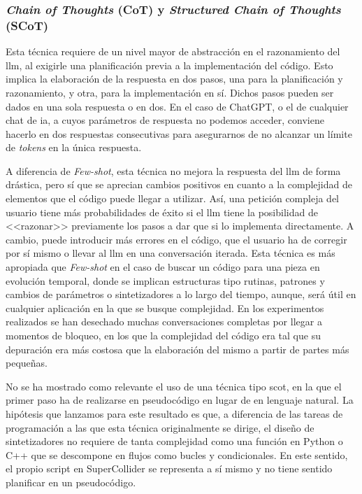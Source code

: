 \subsubsection{\textit{Chain of Thoughts} (CoT) y \textit{Structured Chain of Thoughts} (SCoT)}

Esta técnica requiere de un nivel mayor de abstracción en el razonamiento del \gls{llm}, al exigirle una planificación previa a la implementación del código. Esto implica la elaboración de la respuesta en dos pasos, una para la planificación y razonamiento, y otra, para la implementación en sí. Dichos pasos pueden ser dados en una sola respuesta o en dos. En el caso de ChatGPT, o el de cualquier chat de \gls{ia}, a cuyos parámetros de respuesta no podemos acceder, conviene hacerlo en dos respuestas consecutivas para asegurarnos de no alcanzar un límite de \textit{tokens} en la única respuesta. 

A diferencia de \textit{Few-shot}, esta técnica no mejora la respuesta del \gls{llm} de forma drástica, pero sí que se aprecian cambios positivos en cuanto a la complejidad de elementos que el código puede llegar a utilizar. Así, una petición compleja del usuario tiene más probabilidades de éxito si el \gls{llm} tiene la posibilidad de <<razonar>> previamente los pasos a dar que si lo implementa directamente. A cambio, puede introducir más errores en el código, que el usuario ha de corregir por sí mismo o llevar al \gls{llm} en una conversación iterada. Esta técnica es más apropiada que \textit{Few-shot} en el caso de buscar un código para una pieza en evolución temporal, donde se implican estructuras tipo rutinas, patrones y cambios de parámetros o sintetizadores a lo largo del tiempo, aunque, será útil en cualquier aplicación en la que se busque complejidad. En los experimentos realizados se han desechado muchas conversaciones completas por llegar a momentos de bloqueo, en los que la complejidad del código era tal que su depuración era más costosa que la elaboración del mismo a partir de partes más pequeñas.

No se ha mostrado como relevante el uso de una técnica tipo \gls{scot}, en la que el primer paso ha de realizarse en pseudocódigo en lugar de en lenguaje natural. La hipótesis que lanzamos para este resultado es que, a diferencia de las tareas de programación a las que esta técnica originalmente se dirige, el diseño de sintetizadores no requiere de tanta complejidad como una función en Python o C++ que se descompone en flujos como bucles y condicionales. En este sentido, el propio script en SuperCollider se representa a sí mismo y no tiene sentido planificar en un pseudocódigo.

